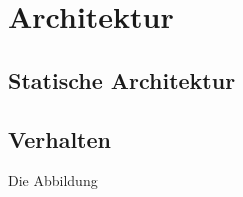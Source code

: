 \chapter{Architektur}
\label{cha:Architektur}

\section{Statische Architektur}

\section{Verhalten}


Die Abbildung %

